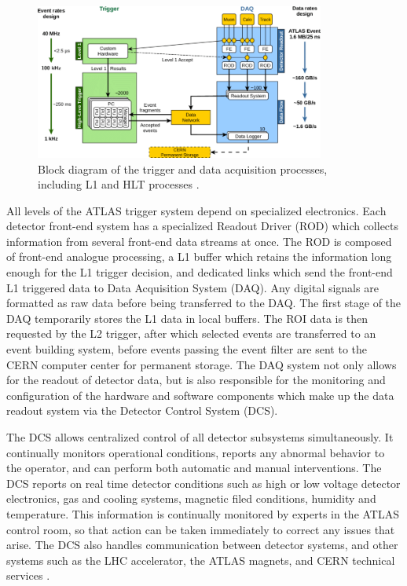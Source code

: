 \begin{figure}
        \centering
	\includegraphics[width=0.85\textwidth]{figures/ch4/tdaq}
	\caption{Block diagram of the trigger and data acquisition processes, including L1 and HLT processes \cite{tdaq}.  }
	\label{fig:tdaq}
\end{figure}
	
	All levels of the ATLAS trigger system depend on specialized electronics. Each detector front-end system has a specialized Readout Driver (ROD) which collects information from several front-end data streams at once. The ROD is composed of front-end analogue processing, a L1 buffer which retains the information long enough for the L1 trigger decision, and dedicated links which send the front-end L1 triggered data to Data Acquisition System (DAQ). Any digital signals are formatted as raw data before being transferred to the DAQ.  The first stage of the DAQ temporarily stores the L1 data in local buffers. The ROI data is then requested by the L2 trigger, after which selected events are transferred to an event building system, before events passing the event filter are sent to the CERN computer center for permanent storage. The DAQ system not only allows for the readout of detector data, but is also responsible for the monitoring and configuration of the hardware and software components which make up the data readout system via the Detector Control System (DCS). \par
	
	The DCS allows centralized control of all detector subsystems simultaneously. It continually monitors operational conditions, reports any abnormal behavior to the operator, and can perform both automatic and manual interventions. The DCS reports on real time detector conditions such as high or low voltage detector electronics, gas and cooling systems, magnetic filed conditions, humidity and temperature. This information is continually monitored by experts in the ATLAS control room, so that action can be taken immediately to correct any issues that arise. The DCS also handles communication between detector systems, and other systems such as the LHC accelerator, the ATLAS magnets, and CERN technical services \cite{atlas_overview}. 

